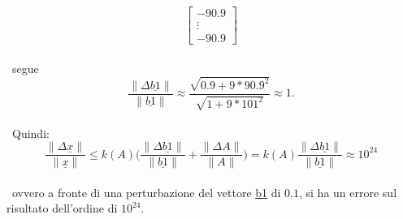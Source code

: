 \begin{itemize}
\begin{itemize}
\[\begin{bmatrix}
				-90.9 \\
				\vdots \\
				-90.9
				\end{bmatrix}
			\]\\\
			segue
			\[
				\frac{\|\Delta\underline{b1}\|}{\|\underline{b1}\|}\approx \frac{\sqrt{0.9+9*90.9^2}}{\sqrt{1+9*101^2}}\approx 1. 
			\]\\\
			Quindi:
			\[
				\frac{\|\Delta\underline{x}\|}{\|\underline{x}\|}\leq k(A)\Bigg(\frac{\|\Delta\underline{b1}\|}{\|\underline{b1}\|}+\frac{\|\Delta A\|}{\|{A}\|}\Bigg) = k(A)\frac{\|\Delta\underline{b1}\|}{\|\underline{b1}\|}\approx 10^{24}
			\]\\\
			ovvero a fronte di una perturbazione del vettore \underline{b1} di $0.1$, si ha un errore sul risultato dell'ordine di $10^{24}$.
	\end{itemize}
\end{itemize}